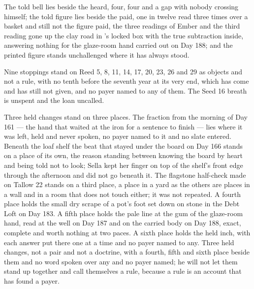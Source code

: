 The told bell lies beside the heard, four, four and a gap with nobody crossing himself; the told figure lies beside the paid, one in twelve read three times over a basket and still not the figure paid, the three readings of Ember and the third reading gone up the clay road in 's locked box with the true subtraction inside, answering nothing for the glaze-room hand carried out on Day 188; and the printed figure stands unchallenged where it has always stood.

Nine stoppings stand on Reed 5, 8, 11, 14, 17, 20, 23, 26 and 29 as objects and not a rule, with no tenth before the seventh year at its very end, which has come and has still not given, and no payer named to any of them. The Seed 16 breath is unspent and the loan uncalled.

Three held changes stand on three places. The fraction from the morning of Day 161 --- the hand that waited at the iron for a sentence to finish --- lies where it was left, held and never spoken, no payer named to it and no slate entered. Beneath the loaf shelf the beat that stayed under the board on Day 166 stands on a place of its own, the reason standing between knowing the board by heart and being told not to look; Sella kept her finger on top of the shelf's front edge through the afternoon and did not go beneath it. The flagstone half-check made on Tallow 22 stands on a third place, a place in a yard as the others are places in a wall and in a room that does not touch either; it was not repeated. A fourth place holds the small dry scrape of a pot's foot set down on stone in the Debt Loft on Day 183. A fifth place holds the pale line at the gum of the glaze-room hand, read at the well on Day 187 and on the carried body on Day 188, exact, complete and worth nothing at two paces. A sixth place holds the held inch, with each answer put there one at a time and no payer named to any. Three held changes, not a pair and not a doctrine, with a fourth, fifth and sixth place beside them and no word spoken over any and no payer named; he will not let them stand up together and call themselves a rule, because a rule is an account that has found a payer.

